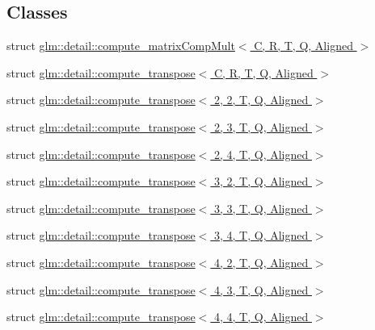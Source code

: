 \subsection*{Classes}
\begin{DoxyCompactItemize}
\item 
struct \hyperlink{structglm_1_1detail_1_1compute__matrixCompMult}{glm\+::detail\+::compute\+\_\+matrix\+Comp\+Mult$<$ C, R, T, Q, Aligned $>$}
\item 
struct \hyperlink{structglm_1_1detail_1_1compute__transpose}{glm\+::detail\+::compute\+\_\+transpose$<$ C, R, T, Q, Aligned $>$}
\item 
struct \hyperlink{structglm_1_1detail_1_1compute__transpose_3_012_00_012_00_01T_00_01Q_00_01Aligned_01_4}{glm\+::detail\+::compute\+\_\+transpose$<$ 2, 2, T, Q, Aligned $>$}
\item 
struct \hyperlink{structglm_1_1detail_1_1compute__transpose_3_012_00_013_00_01T_00_01Q_00_01Aligned_01_4}{glm\+::detail\+::compute\+\_\+transpose$<$ 2, 3, T, Q, Aligned $>$}
\item 
struct \hyperlink{structglm_1_1detail_1_1compute__transpose_3_012_00_014_00_01T_00_01Q_00_01Aligned_01_4}{glm\+::detail\+::compute\+\_\+transpose$<$ 2, 4, T, Q, Aligned $>$}
\item 
struct \hyperlink{structglm_1_1detail_1_1compute__transpose_3_013_00_012_00_01T_00_01Q_00_01Aligned_01_4}{glm\+::detail\+::compute\+\_\+transpose$<$ 3, 2, T, Q, Aligned $>$}
\item 
struct \hyperlink{structglm_1_1detail_1_1compute__transpose_3_013_00_013_00_01T_00_01Q_00_01Aligned_01_4}{glm\+::detail\+::compute\+\_\+transpose$<$ 3, 3, T, Q, Aligned $>$}
\item 
struct \hyperlink{structglm_1_1detail_1_1compute__transpose_3_013_00_014_00_01T_00_01Q_00_01Aligned_01_4}{glm\+::detail\+::compute\+\_\+transpose$<$ 3, 4, T, Q, Aligned $>$}
\item 
struct \hyperlink{structglm_1_1detail_1_1compute__transpose_3_014_00_012_00_01T_00_01Q_00_01Aligned_01_4}{glm\+::detail\+::compute\+\_\+transpose$<$ 4, 2, T, Q, Aligned $>$}
\item 
struct \hyperlink{structglm_1_1detail_1_1compute__transpose_3_014_00_013_00_01T_00_01Q_00_01Aligned_01_4}{glm\+::detail\+::compute\+\_\+transpose$<$ 4, 3, T, Q, Aligned $>$}
\item 
struct \hyperlink{structglm_1_1detail_1_1compute__transpose_3_014_00_014_00_01T_00_01Q_00_01Aligned_01_4}{glm\+::detail\+::compute\+\_\+transpose$<$ 4, 4, T, Q, Aligned $>$}

\end{DoxyCompactItemize}
